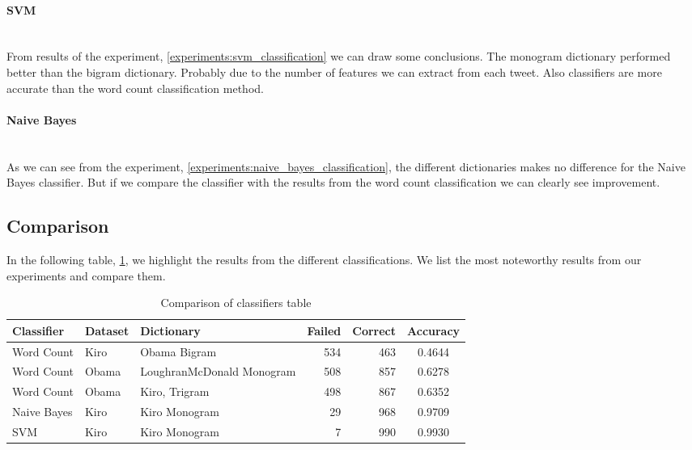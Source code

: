 \paragraph{SVM}\label{results:svm_classification}
\hspace{0pt}\\
From results of the experiment, \ref{experiments:svm_classification} we can draw
some conclusions. The monogram dictionary performed
better than the bigram dictionary. Probably due to the number of features we
can extract from each tweet. Also classifiers are more accurate than the word
count classification method.

\paragraph{Naive Bayes}\label{results:naive_bayes_classification}
\hspace{0pt}\\
As we can see from the experiment,
\ref{experiments:naive_bayes_classification}, the different dictionaries makes
no difference for the Naive Bayes classifier. But if we compare the classifier
with the results from the word count classification we can clearly see
improvement. 

\subsection{Comparison}\label{results:comparison}
In the following table, \ref{tbl:classification_comparison}, we highlight the
results from the different classifications. We list the most noteworthy results
from our experiments and compare them.

\begin{table}
\centering
\label{tbl:classification_comparison}
\caption{Comparison of classifiers table}
\begin{tabular}{ l l p{3.5cm} r r c }
Classifier & Dataset & Dictionary & Failed & Correct & Accuracy \\
\hline
Word Count & Kiro & Obama Bigram & 534 & 463 & 0.4644 \\
Word Count & Obama & LoughranMcDonald Monogram & 508 & 857 & 0.6278 \\
Word Count & Obama & Kiro, Trigram & 498 & 867 & 0.6352 \\
Naive Bayes & Kiro & Kiro Monogram & 29 & 968 & 0.9709 \\
SVM & Kiro & Kiro Monogram & 7 & 990 & 0.9930 \\
\end{tabular}
\end{table}

